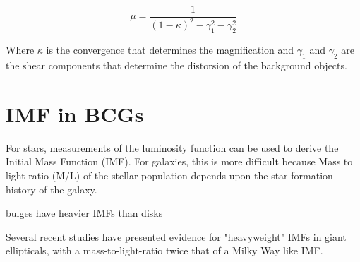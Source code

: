 \begin{equation}
\mu = \frac{1}{(1-\kappa)^{2}-\gamma^{2}_{1}-\gamma^{2}_{2}}
\end{equation}

Where $\kappa$ is the convergence that determines the magnification and $\gamma_{1}$ and $\gamma_{2}$ are the shear components that determine the distorsion of the background objects.

\section{IMF in BCGs}

For stars, measurements of the luminosity function can be
used to derive the Initial Mass Function (IMF).
For galaxies, this is more difficult because Mass to light ratio (M/L) of the stellar population
depends upon the star formation history of
the galaxy.

bulges have heavier IMFs than disks

Several recent studies have presented evidence for "heavyweight" IMFs in giant ellipticals, with a mass-to-light-ratio twice that of a Milky Way like IMF.



 
 